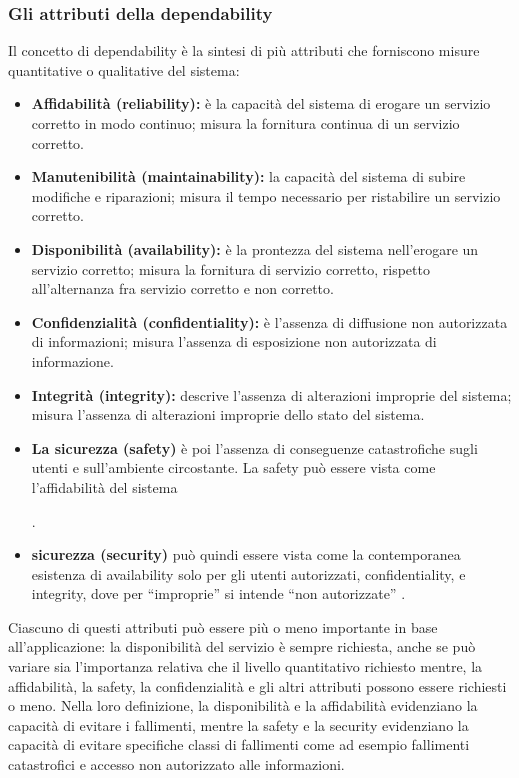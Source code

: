 \documentclass[14pt]{extarticle}
\begin{document}
\subsubsection{Gli attributi della dependability}
Il concetto di dependability è la sintesi di più attributi che forniscono misure
quantitative o qualitative del sistema:
\begin{itemize}
\item \textbf{Affidabilità (reliability):} è la capacità del sistema di erogare un servizio corretto in modo continuo; misura la fornitura continua di un servizio
corretto.
\item \textbf{Manutenibilità (maintainability):} la capacità del sistema di subire modifiche e riparazioni; misura il tempo necessario per ristabilire un servizio
corretto.
\item \textbf{Disponibilità (availability):} è la prontezza del sistema nell’erogare un
servizio corretto; misura la fornitura di servizio corretto, rispetto all’alternanza fra servizio corretto e non corretto.
\item \textbf{Confidenzialità (confidentiality):} è l’assenza di diffusione non autorizzata di informazioni; misura l’assenza di esposizione non autorizzata di
informazione.
\item \textbf{Integrità (integrity):} descrive l’assenza di alterazioni improprie del sistema; misura l’assenza di alterazioni improprie dello stato del sistema.

\item \textbf{La sicurezza (safety)} è poi l’assenza di conseguenze catastrofiche sugli
utenti e sull’ambiente circostante. La safety può essere vista come l’affidabilità
del sistema .
\item \textbf{sicurezza (security)} può quindi essere vista come la contemporanea esistenza di availability solo per gli utenti autorizzati, confidentiality, e
integrity, dove per “improprie” si intende “non autorizzate” \cite{nicol2004model}.
\end{itemize}
Ciascuno di questi attributi può essere più o meno importante in base all’applicazione: la disponibilità del servizio è sempre richiesta, anche se può
variare sia l’importanza relativa che il livello quantitativo richiesto mentre, la affidabilità, la safety, la confidenzialità e gli altri attributi possono essere richiesti
o meno. Nella loro definizione, la disponibilità e la affidabilità evidenziano la
capacità di evitare i fallimenti, mentre la safety e la security evidenziano la
capacità di evitare specifiche classi di fallimenti come ad esempio fallimenti
catastrofici e accesso non autorizzato alle informazioni.
\end{document}
